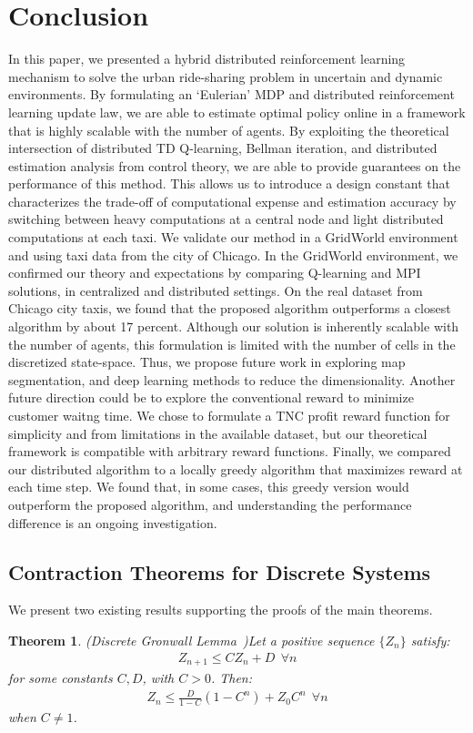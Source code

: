 \documentclass[journal]{IEEEtran}
\newtheorem{theorem}{Theorem}
\begin{document}
\section{Conclusion} \label{sec_conclusion}
In this paper, we presented a hybrid distributed reinforcement learning mechanism to solve the urban ride-sharing problem in uncertain and dynamic environments. By formulating an `Eulerian' MDP and distributed reinforcement learning update law, we are able to estimate optimal policy online in a framework that is highly scalable with the number of agents. By exploiting the theoretical intersection of distributed TD Q-learning, Bellman iteration, and distributed estimation analysis from control theory, we are able to provide guarantees on the performance of this method. This allows us to introduce a design constant that characterizes the trade-off of computational expense and estimation accuracy by switching between heavy computations at a central node and light distributed computations at each taxi. We validate our method in a GridWorld environment and using taxi data from the city of Chicago. In the GridWorld environment, we confirmed our theory and expectations by comparing Q-learning and MPI solutions, in centralized and distributed settings. On the real dataset from Chicago city taxis, we found that the proposed algorithm outperforms a closest algorithm by about 17 percent. 
Although our solution is inherently scalable with the number of agents, this formulation is limited with the number of cells in the discretized state-space. Thus, we propose future work in exploring map segmentation, and deep learning methods to reduce the dimensionality. 
Another future direction could be to explore the conventional reward to minimize customer waitng time. We chose to formulate a TNC profit reward function for simplicity and from limitations in the available dataset, but our theoretical framework is compatible with arbitrary reward functions. Finally, we compared our distributed algorithm to a locally greedy algorithm that maximizes reward at each time step. We found that, in some cases, this greedy version would outperform the proposed algorithm, and understanding the performance difference is an ongoing investigation. 

\appendix
\subsection{Contraction Theorems for Discrete Systems}
We present two existing results supporting the proofs of the main theorems.
\begin{theorem}{(Discrete Gronwall Lemma~\cite{stuart_1996})}\label{thm:discrete_gronwall}
    Let a positive sequence $\{Z_n\}$ satisfy:
    \begin{align*}
        Z_{n+1} \leq C Z_n + D \ \ \forall n
    \end{align*}
    for some constants $C, D$, with $C>0$. Then:
    \begin{align*}
        Z_n \leq \frac{ D}{ 1 - C} (1 - C^n) + Z_0 C^n \ \ \forall n
    \end{align*}
    when $C \neq 1$.
\end{theorem}
\end{document}

